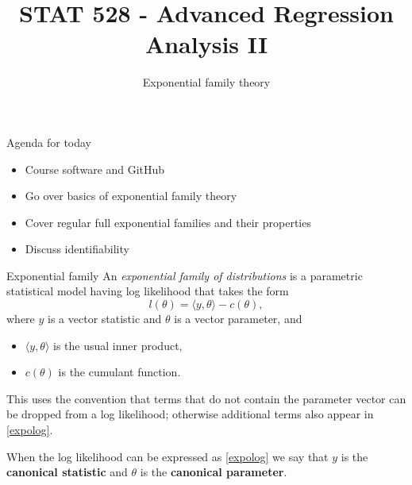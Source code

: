 \documentclass[
  ignorenonframetext,
]{beamer}
\title{STAT 528 - Advanced Regression Analysis II}
\author{Exponential family theory}
\date{}
\institute{Daniel J. Eck\\
Department of Statistics\\
University of Illinois}
\providecommand{\tightlist}{%
  \setlength{\itemsep}{0pt}\setlength{\parskip}{0pt}}
\begin{document}
\frame{\titlepage}

\begin{frame}
\newcommand{\R}{\mathbb{R}}
\newcommand{\Prob}{\mathbb{P}}
\newcommand{\Proj}{\textbf{P}}
\newcommand{\Hcal}{\mathcal{H}}
\newcommand{\rootn}{\sqrt{n}}
\newcommand{\p}{\mathbf{p}}
\newcommand{\E}{\text{E}}
\newcommand{\Var}{\text{Var}}
\newcommand{\Cov}{\text{Cov}}

\newtheorem{cor}{Corollary}
\newtheorem{lem}{Lemma}
\newtheorem{thm}{Theorem}
\newtheorem{defn}{Definition}
\newtheorem{prop}{Proposition}
\end{frame}

\begin{frame}{Agenda for today}
\protect\hypertarget{agenda-for-today}{}
\begin{itemize}
\tightlist
\item
  Course software and GitHub
\item
  Go over basics of exponential family theory
\item
  Cover regular full exponential families and their properties
\item
  Discuss identifiability
\end{itemize}
\end{frame}

\begin{frame}{Exponential family}
\protect\hypertarget{exponential-family}{}
An \emph{exponential family of distributions} is a parametric
statistical model having log likelihood that takes the form
\begin{equation} \label{expolog}
    l(\theta) = \langle y,\theta \rangle - c(\theta),
\end{equation} where \(y\) is a vector statistic and \(\theta\) is a
vector parameter, and

\begin{itemize}
\tightlist
\item
  \(\langle y,\theta \rangle\) is the usual inner product,
\item
  \(c(\theta)\) is the cumulant function.
\end{itemize}

This uses the convention that terms that do not contain the parameter
vector can be dropped from a log likelihood; otherwise additional terms
also appear in \eqref{expolog}.

When the log likelihood can be expressed as \eqref{expolog} we say that
\(y\) is the \textbf{canonical statistic} and \(\theta\) is the
\textbf{canonical parameter}.
\end{frame}
\end{document}
